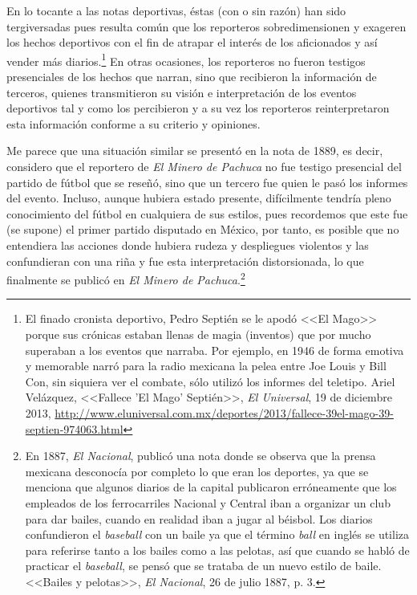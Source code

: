 \documentclass[11pt,a5paper,twoside]{book} %
\begin{document}
En lo tocante a las notas deportivas, éstas (con o sin razón) han sido tergiversadas pues resulta común que los reporteros sobredimensionen y exageren los hechos deportivos con el fin de atrapar el interés de los aficionados y así vender más diarios.\footnote{El finado cronista deportivo, Pedro Septién se le apodó <<El Mago>> porque sus crónicas estaban llenas de magia (inventos) que por mucho superaban a los eventos que narraba. Por ejemplo, en 1946 de forma emotiva y memorable narró para la radio mexicana la pelea entre Joe Louis y Bill Con, sin siquiera ver el combate, sólo utilizó los informes del teletipo. Ariel Velázquez, <<Fallece 'El Mago' Septién>>, \emph{El Universal}, 19 de diciembre 2013, \url{http://www.eluniversal.com.mx/deportes/2013/fallece-39el-mago-39-septien-974063.html}} En otras ocasiones, los reporteros no fueron testigos presenciales de los hechos que narran, sino que recibieron la información de terceros, quienes transmitieron su visión e interpretación de los eventos deportivos tal y como los percibieron y a su vez los reporteros reinterpretaron esta información conforme a su criterio y opiniones.

Me parece que una situación similar se presentó en la nota de 1889, es decir, considero que el reportero de \emph{El Minero de Pachuca} no fue testigo presencial del partido de fútbol que se reseñó, sino que un tercero fue quien le pasó los informes del evento. Incluso, aunque hubiera estado presente, difícilmente tendría pleno conocimiento del fútbol en cualquiera de sus estilos, pues recordemos que este fue (se supone) el primer partido disputado en México, por tanto, es posible que no entendiera las acciones donde hubiera rudeza y despliegues violentos y las confundieran con una riña y fue esta interpretación distorsionada, lo que finalmente se publicó en \emph{El Minero de Pachuca}.\footnote{En 1887, \emph{El Nacional}, publicó una nota donde se observa que la prensa mexicana desconocía por completo lo que eran los deportes, ya que se menciona que algunos diarios de la capital publicaron erróneamente que los empleados de los ferrocarriles Nacional y Central iban a organizar un club para dar bailes, cuando en realidad iban a jugar al béisbol. Los diarios confundieron el \emph{baseball} con un baile ya que el término \emph{ball} en inglés se utiliza para referirse tanto a los bailes como a las pelotas, así que cuando se habló de practicar el \emph{baseball}, se pensó que se trataba de un nuevo estilo de baile. <<Bailes y pelotas>>, \emph{El Nacional}, 26 de julio 1887, p. 3.}
\end{document}

